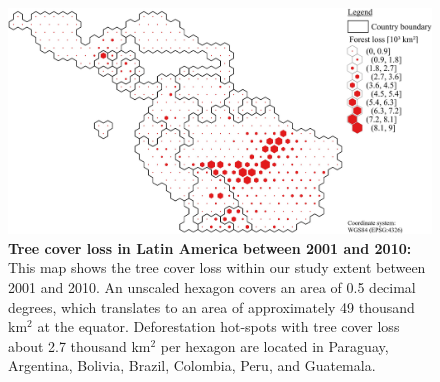 			\begin{figure}[ht]
				\centering
				\includegraphics[scale=.85]{img/americas_loss_frameless}
				\caption[Tree cover loss in Latin America between 2001 and 2010]{\textbf{Tree cover loss in Latin America between 2001 and 2010:} This map shows the tree cover loss within our study extent between 2001 and 2010. An unscaled hexagon covers an area of 0.5 decimal degrees, which translates to an area of approximately 49 thousand km$^2$ at the equator. Deforestation hot-spots with tree cover loss about 2.7 thousand km$^2$ per hexagon are located in Paraguay, Argentina, Bolivia, Brazil, Colombia, Peru, and Guatemala.}
				\label{fig:americas_loss}
			\end{figure}

